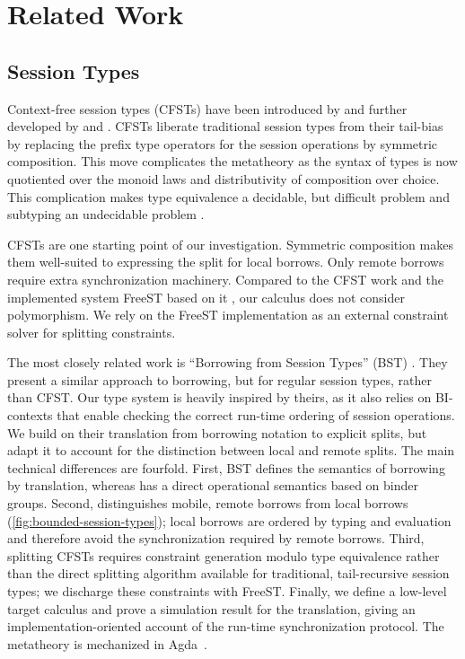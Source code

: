 
\section{Related Work}
\label{sec:related-work}

\subsection{Session Types}
\label{sec:session-types}

Context-free session types (CFSTs) have been introduced by
\citet{DBLP:conf/icfp/ThiemannV16} and further developed by
\citet{DBLP:journals/toplas/Padovani19} and
\citet{DBLP:journals/iandc/AlmeidaMTV22}. CFSTs liberate traditional 
session types from their tail-bias by replacing the prefix type
operators for the session operations by symmetric composition. This
move complicates the metatheory as the syntax of types is now
quotiented over the monoid laws and distributivity of composition over
choice. This complication makes type equivalence a decidable, but
difficult problem \cite{DBLP:conf/tacas/AlmeidaMV20} and subtyping an
undecidable problem
\cite{DBLP:journals/toplas/Padovani19,DBLP:journals/tcs/SilvaMV26}.

CFSTs are one starting point of our investigation. Symmetric
composition makes them well-suited to expressing the split for local
borrows. Only remote borrows require extra synchronization
machinery. Compared to the CFST work and the implemented system FreeST
based on it \cite{almeida26:_frees_concur_progr_languag_with}, our
calculus does not consider polymorphism. We rely on the FreeST
implementation as an external constraint solver for splitting
constraints.


The most closely related work is ``Borrowing from Session Types'' (BST) \cite{DBLP:journals/pacmpl/SaffrichS0V25}.
They present a similar approach to borrowing, but for regular session types, rather than CFST.
Our type system is heavily inspired by theirs, as it also relies on
BI-contexts that enable checking the correct run-time ordering of session operations.
We build on their translation from borrowing notation to explicit
splits, but adapt it to account for the distinction between local and
remote splits. The main technical differences are fourfold. First, BST
defines the semantics of borrowing by translation, whereas
\thecalculus has a direct operational semantics based on binder
groups. Second, \thecalculus distinguishes mobile, remote borrows from
local borrows (\cref{fig:bounded-session-types}); local
borrows are ordered by typing and evaluation and therefore avoid the
synchronization required by remote borrows. Third, splitting CFSTs
requires constraint generation modulo type equivalence rather than the
direct splitting algorithm available for traditional, tail-recursive
session types; we discharge these constraints with FreeST. Finally, we
define a low-level target calculus and prove a simulation result for
the translation, giving an implementation-oriented account of the
run-time synchronization protocol. The metatheory is mechanized in
Agda~\cite{Agda}.

